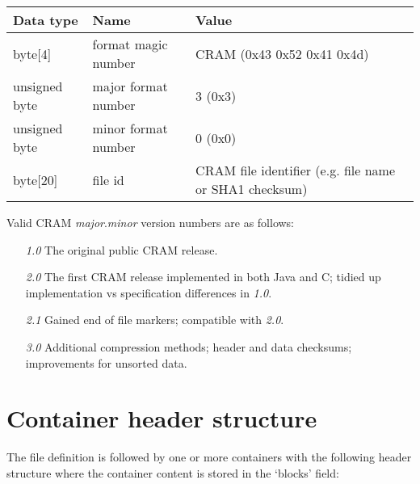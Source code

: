 \documentclass[a4paper]{article}
\begin{document}
\begin{tabular}{|l|l|l|}
\hline
\textbf{Data type} & \textbf{Name} & \textbf{Value}\tabularnewline
\hline
byte[4] & format magic number & CRAM (0x43 0x52 0x41 0x4d)\tabularnewline
\hline
unsigned byte & major format number & 3 (0x3)\tabularnewline
\hline
unsigned byte & minor format number & 0 (0x0)\tabularnewline
\hline
byte[20] & file id & CRAM file identifier (e.g. file name or SHA1 checksum)\tabularnewline
\hline
\end{tabular}

Valid CRAM \textit{major}.\textit{minor} version numbers are as follows:

\begin{itemize}
\item[\textit{1.0}]
The original public CRAM release.

\item[\textit{2.0}]
The first CRAM release implemented in both Java and C; tidied up
implementation vs specification differences in \textit{1.0}.

\item[\textit{2.1}]
Gained end of file markers; compatible with \textit{2.0}.

\item[\textit{3.0}]
Additional compression methods; header and data checksums;
improvements for unsorted data.
\end {itemize}

\section{\textbf{Container header structure}}

The file definition is followed by one or more containers with the following header 
structure where the container content is stored in the `blocks' field:
\end{document}
